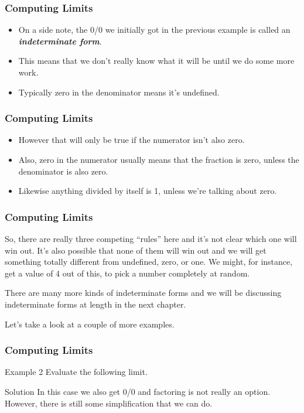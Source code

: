 \documentclass{beamer}
\begin{document}
\begin{frame}[fragile]
	\frametitle{Computing Limits}
	\Large
\begin{itemize}
\item On a side note, the 0/0 we initially got in the previous example is called an \textbf{\textit{indeterminate form}}.  
\item This means that we don’t really know what it will be until we do some more work.  
\item Typically zero in the denominator means it’s undefined.
\end{itemize}	
  
\end{frame}
\begin{frame}[fragile]
	\frametitle{Computing Limits}
	\Large
\begin{itemize}
	\item  However that will only be true if the numerator isn’t also zero.  
	\item Also, zero in the numerator usually means that the fraction is zero, unless the denominator is also zero.  
	\item Likewise anything divided by itself is 1, unless we’re talking about zero.
\end{itemize}
\end{frame}
\begin{frame}[fragile]
	\frametitle{Computing Limits}
	\Large
	
So, there are really three competing “rules” here and it’s not clear which one will win out.  It’s also possible that none of them will win out and we will get something totally different from undefined, zero, or one.  We might, for instance, get a value of 4 out of this, to pick a number completely at random.

There are many more kinds of indeterminate forms and we will be discussing indeterminate forms at length in the next chapter.

Let’s take a look at a couple of more examples.
\end{frame}
\begin{frame}[fragile]
	\frametitle{Computing Limits}
	\Large
	
Example 2  Evaluate the following limit.

Solution
In this case we also get 0/0 and factoring is not really an option.  However, there is still some simplification that we can do.
\end{frame}
\end{document}
